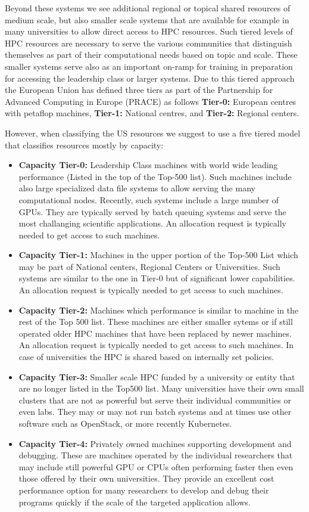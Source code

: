 \documentclass[utf8]{FrontiersinVancouver} %
\begin{document}
Beyond these systems we see additional regional or topical shared resources of
medium scale, but also smaller scale systems that are available for
example in many universities to allow direct access to HPC 
resources. Such tiered levels of HPC resources are necessary to serve the various
communities that distinguish themselves as part of their computational
needs based on topic and scale. These smaller systems serve also as an
important on-ramp for training in preparation for accessing the
leadership class or larger systems.
Due to this tiered approach the European Union has defined three tiers as part of the
Partnership for Advanced Computing in Europe (PRACE) as follows
{\bf Tier-0:} European centres with petaflop machines,
{\bf Tier-1:} National centres, and
{\bf Tier-2:} Regional centers.
  
However, when classifying the US resources we suggest to use a five
tiered model that classifies resources mostly by capacity:

\begin{itemize}
\item {\bf Capacity Tier-0:} Leadership Class machines with world wide leading
  performance (Listed in the top of the Top-500 list). Such machines include also large specialized data file systems to allow serving the many computational nodes. Recently, such systems include a large number of GPUs. They are typically served by batch queuing systems and serve the most challanging scientific applications. An allocation request is typically needed to get access to such machines.
\item {\bf Capacity Tier-1:} Machines in the upper portion of the Top-500 List which may be part of   National centers, Regional Centers  or Universities. Such systems are similar to the one in Tier-0 but of significant lower capabilities.
An allocation request is typically needed to get access to such machines.
\item {\bf Capacity Tier-2:} Machines which performance is similar to machine
  in the rest of the Top 500 list. These machines are either smaller sytems or if still operated older HPC machines that have been replaced by newer machines.
  An allocation request is typically needed to get access to such machines. In case of universities the HPC is shared based on internally set policies.
\item {\bf Capacity Tier-3:} Smaller scale HPC funded by a university or entity
  that are no longer listed in the Top500 list. Many universities have their own small clusters that are not as powerful but serve their individual communities or even labs. They may or may not run batch systems and at times use other software such as OpenStack, or more recently Kubernetes. 
\item {\bf Capacity Tier-4:} Privately owned machines supporting development
  and debugging. These are machines operated by the individual researchers that may include still powerful GPU or CPUs often performing faster then even those offered by their own universities. They provide an excellent cost performance option for many researchers to develop and debug their programs quickly if the scale of the targeted application allows.
  
\end{itemize}
\end{document}
